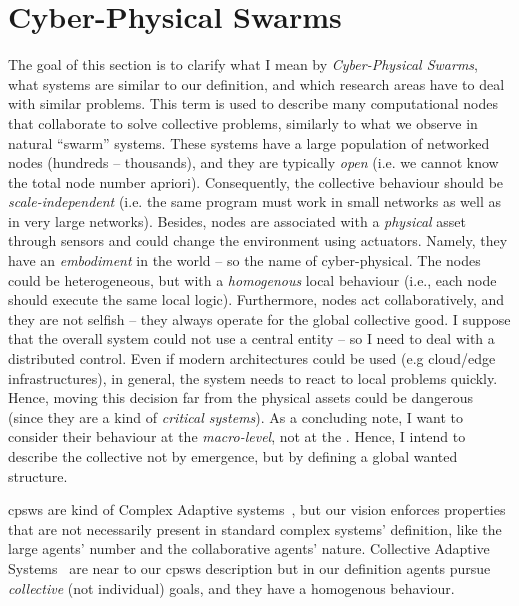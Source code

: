 \chapter{Cyber-Physical Swarms}\label{chap:cpsw}
\minitoc%

The goal of this section is to clarify what I mean by \textit{Cyber-Physical Swarms}, what systems are similar to our definition, and which research areas have to deal with similar problems.
This term is used to describe many computational nodes that collaborate to solve collective problems, similarly to what we observe in natural ``swarm'' systems.
%
These systems have a large population of networked nodes (hundreds -- thousands), and they are typically \textit{open} (i.e. we cannot know the total node number apriori). 
%
Consequently, the collective behaviour should be \textit{scale-independent} (i.e. the same program must work in small networks as well as in very large networks).
%
Besides, nodes are associated with a \textit{physical} asset through sensors and could change the environment using actuators. 
%
Namely, they have an \emph{embodiment} in the world -- so the name of cyber-physical. 
%
The nodes could be heterogeneous, but with a \emph{homogenous} local behaviour (i.e., each node should execute the same local logic). 
%
Furthermore, nodes act collaboratively, and they are not selfish -- they always operate for the global collective good.
%
I suppose that the overall system could not use a central entity -- so I need to deal with a distributed control. 
%
Even if modern architectures could be used (e.g cloud/edge infrastructures), in general, the system needs to react to local problems quickly. 
%
Hence, moving this decision far from the physical assets could be dangerous (since they are a kind of \emph{critical systems}).
%
As a concluding note, I want to consider their behaviour at the \textit{macro-level}, not at the . 
%
Hence, I intend to describe the collective not by emergence, but by defining a global wanted structure.

\acp{cpsw} are kind of Complex Adaptive systems~\cite{holland1992complex}, but our vision enforces properties that are not necessarily present in standard complex systems' definition, like the large agents' number and the collaborative agents' nature.
Collective Adaptive Systems~\cite{DBLP:journals/corr/abs-1108-5643} are near to our \acp{cpsw} description but in our definition agents pursue \emph{collective} (not individual) goals, and they have a homogenous behaviour.

